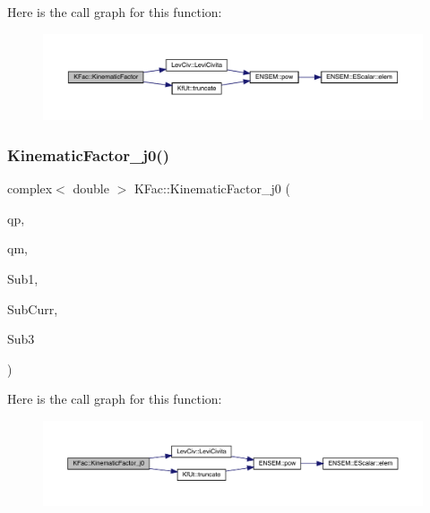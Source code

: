 Here is the call graph for this function\+:
\nopagebreak
\begin{figure}[H]
\begin{center}
\leavevmode
\includegraphics[width=350pt]{d2/d89/namespaceKFac_a56130e258872427e83c530a5a471cf5c_cgraph}
\end{center}
\end{figure}
\mbox{\label{namespaceKFac_a6f8f443ade2532c958e4dc168d7da1c7}} 
\subsubsection{\texorpdfstring{KinematicFactor\_j0()}{KinematicFactor\_j0()}}
{\footnotesize\ttfamily complex$<$ double $>$ K\+Fac\+::\+Kinematic\+Factor\+\_\+j0 (\begin{DoxyParamCaption}\item[{Eigen\+::\+Vector\+Xd \&}]{qp,  }\item[{Eigen\+::\+Vector\+Xd \&}]{qm,  }\item[{Eigen\+::\+Matrix\+Xcd \&}]{Sub1,  }\item[{Eigen\+::\+Matrix\+Xcd \&}]{Sub\+Curr,  }\item[{Eigen\+::\+Matrix\+Xcd \&}]{Sub3 }\end{DoxyParamCaption})}

Here is the call graph for this function\+:
\nopagebreak
\begin{figure}[H]
\begin{center}
\leavevmode
\includegraphics[width=350pt]{d2/d89/namespaceKFac_a6f8f443ade2532c958e4dc168d7da1c7_cgraph}
\end{center}
\end{figure}
\mbox{\label{namespaceKFac_a5fe5ea6a5ab8c5c87ca764f254396434}} 
